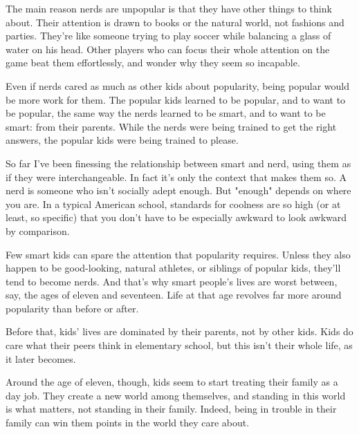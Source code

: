 The main reason nerds
                  are unpopular is that they have other things to think about.
                  Their attention is drawn to books or the natural world, not
                  fashions and parties. They're like someone trying to play
                  soccer while balancing a glass of water on his head. Other
                  players who can focus their whole attention on the game beat
                  them effortlessly, and wonder why they seem so incapable.

Even
                  if nerds cared as much as other kids about popularity, being
                  popular would be more work for them. The popular kids learned
                  to be popular, and to want to be popular, the same way the
                  nerds learned to be smart, and to want to be smart: from their
                  parents. While the nerds were being trained to get the right
                  answers, the popular kids were being trained to please.




                  So far I've been finessing the relationship between smart and
                  nerd, using them as if they were interchangeable. In fact it's
                  only the context that makes them so. A nerd is someone who
                  isn't socially adept enough. But "enough" depends on where you
                  are. In a typical American school, standards for coolness are
                  so high (or at least, so specific) that you don't have to be
                  especially awkward to look awkward by comparison.

Few
                  smart kids can spare the attention that popularity requires.
                  Unless they also happen to be good-looking, natural athletes,
                  or siblings of popular kids, they'll tend to become nerds. And
                  that's why smart people's lives are worst between, say, the
                  ages of eleven and seventeen. Life at that age revolves far
                  more around popularity than before or after.

Before
                  that, kids' lives are dominated by their parents, not by other
                  kids. Kids do care what their peers think in elementary
                  school, but this isn't their whole life, as it later
                  becomes.

Around the age of eleven, though, kids
                  seem to start treating their family as a day job. They create
                  a new world among themselves, and standing in this world is
                  what matters, not standing in their family. Indeed, being in
                  trouble in their family can win them points in the world they
                  care about.


